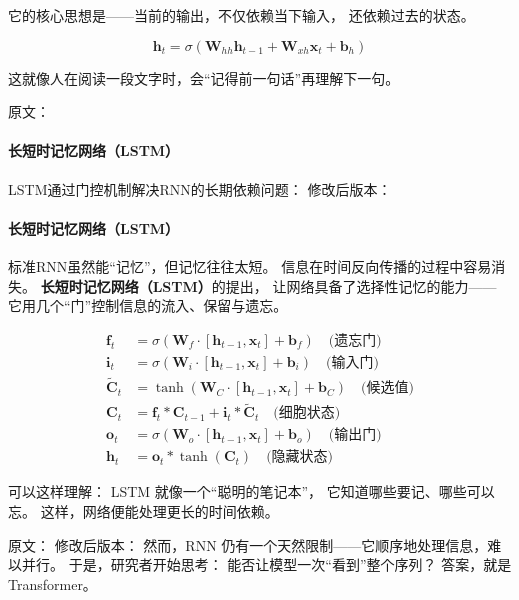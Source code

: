 它的核心思想是——当前的输出，不仅依赖当下输入，  
还依赖过去的状态。  

$$\mathbf{h}_t = \sigma(\mathbf{W}_{hh} \mathbf{h}_{t-1} + \mathbf{W}_{xh} \mathbf{x}_t + \mathbf{b}_h)$$

这就像人在阅读一段文字时，会“记得前一句话”再理解下一句。



原文：
\paragraph{长短时记忆网络（LSTM）}
LSTM通过门控机制解决RNN的长期依赖问题：
修改后版本：
\paragraph{长短时记忆网络（LSTM）}  
标准RNN虽然能“记忆”，但记忆往往太短。  
信息在时间反向传播的过程中容易消失。  
\textbf{长短时记忆网络（LSTM）}的提出，  
让网络具备了选择性记忆的能力——  
它用几个“门”控制信息的流入、保留与遗忘。

\begin{align}
\mathbf{f}_t &= \sigma(\mathbf{W}_f \cdot [\mathbf{h}_{t-1}, \mathbf{x}_t] + \mathbf{b}_f) \quad \text{(遗忘门)} \\
\mathbf{i}_t &= \sigma(\mathbf{W}_i \cdot [\mathbf{h}_{t-1}, \mathbf{x}_t] + \mathbf{b}_i) \quad \text{(输入门)} \\
\tilde{\mathbf{C}}_t &= \tanh(\mathbf{W}_C \cdot [\mathbf{h}_{t-1}, \mathbf{x}_t] + \mathbf{b}_C) \quad \text{(候选值)} \\
\mathbf{C}_t &= \mathbf{f}_t * \mathbf{C}_{t-1} + \mathbf{i}_t * \tilde{\mathbf{C}}_t \quad \text{(细胞状态)} \\
\mathbf{o}_t &= \sigma(\mathbf{W}_o \cdot [\mathbf{h}_{t-1}, \mathbf{x}_t] + \mathbf{b}_o) \quad \text{(输出门)} \\
\mathbf{h}_t &= \mathbf{o}_t * \tanh(\mathbf{C}_t) \quad \text{(隐藏状态)}
\end{align}

可以这样理解：  
LSTM 就像一个“聪明的笔记本”，  
它知道哪些要记、哪些可以忘。  
这样，网络便能处理更长的时间依赖。



原文：
修改后版本：
然而，RNN 仍有一个天然限制——它顺序地处理信息，难以并行。  
于是，研究者开始思考：  
能否让模型一次“看到”整个序列？  
答案，就是Transformer。


